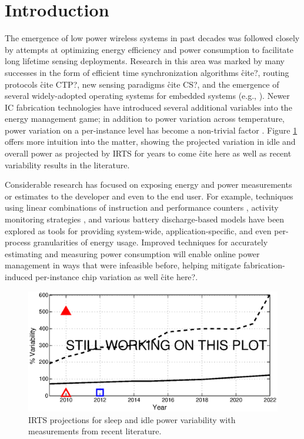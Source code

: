 \section{Introduction}
The emergence of low power wireless systems in past decades was followed closely by attempts at optimizing energy efficiency and power consumption to facilitate long lifetime sensing deployments.  Research in this area was marked by many successes in the form of efficient time synchronization algorithms \r{cite?}, routing protocols \r{cite CTP?}, new sensing paradigms \r{cite CS?}, and the emergence of several widely-adopted operating systems for embedded systems (e.g., \cite{tinyos, contiki}). Newer IC fabrication technologies have introduced several additional variables into the energy management game; in addition to power variation across temperature, power variation on a per-instance level has become a non-trivial factor \cite{borkar2003, gupta2003}. Figure \ref{fig:variation} offers more intuition into the matter, showing the projected variation in idle and overall power as projected by IRTS for years to come \r{cite here} as well as recent variability results in the literature. 

Considerable research has focused on exposing energy and power measurements or estimates to the developer and even to the end user.  For example, techniques using linear combinations of instruction and performance counters \cite{sun2012,singh2009}, activity monitoring strategies \cite{appscope}, and various battery discharge-based models \cite{zhang2010} have been explored as tools for providing system-wide, application-specific, and even per-process granularities of energy usage.  Improved techniques for accurately  estimating and measuring power consumption will enable online power management in ways that were infeasible before, helping mitigate fabrication-induced per-instance chip variation as well \r{cite here?}. 

\begin{figure}
\centering
\includegraphics[width=1\columnwidth]{figures/projected_variations.eps}
\caption{\label{fig:variation}IRTS projections for sleep and idle power variability with measurements from recent literature.}
\end{figure}

